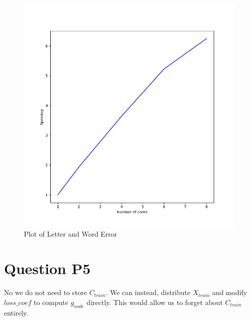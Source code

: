 \documentclass[11pt]{report}
\begin{document}
\begin{figure}[b]
\centering
\includegraphics[scale=0.4]{p4_figure.png}
\caption{Plot of Letter and Word Error}
\end{figure}

\section*{Question P5}
No we do not need to store $C_{train}$. We can instead, distribute $X_{train}$
and modify $loss\_coef$ to compute $g_{node}$ directly. This would allow us to
forget about $C_{train}$ entirely.
\end{document}
